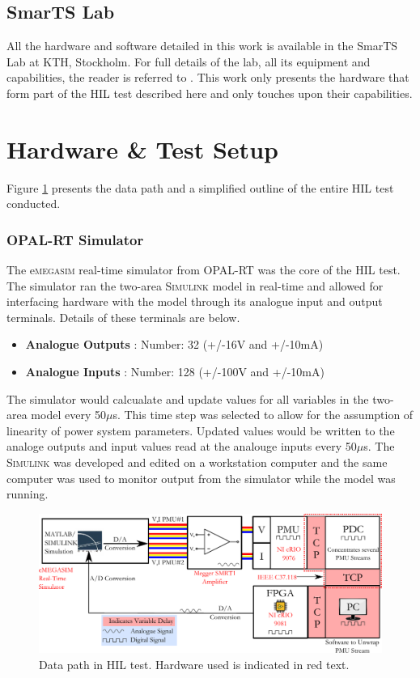 \documentclass[conference]{IEEEtran}
\begin{document}
\subsection{SmarTS Lab}
All the hardware and software detailed in this work is available in the SmarTS Lab at KTH, Stockholm. For full details of the lab, all its equipment and capabilities, the reader is referred to \cite{SmarTSLab}. This work only presents the hardware that form part of the HIL test described here and only touches upon their capabilities.

\section{Hardware \& Test Setup}

Figure \ref{ExperimentOutline} presents the data path and a simplified outline of the entire HIL test conducted.

\subsubsection{OPAL-RT Simulator}
The e\textsc{megasim} real-time simulator from OPAL-RT\cite{OPALemegasim} was the core of the HIL test. The simulator ran the two-area \textsc{Simulink} model in real-time and allowed for interfacing hardware with the model through its analogue input and output terminals.  Details of these terminals are below.

\begin{itemize}
\item \textbf{Analogue Outputs} : Number: 32 (+/-16V and +/-10mA)
\item \textbf{Analogue Inputs} : Number: 128 (+/-100V and +/-10mA)
\end{itemize}

The simulator would calcualate and update values for all variables in the two-area model every 50$\mu$s. This time step was selected to allow for the assumption of linearity of power system parameters. Updated values would be written to the analoge outputs and input values read at the analouge inputs every 50$\mu$s. The \textsc{Simulink} was developed and edited on a workstation computer and the same computer was used to monitor output from the simulator while the model was running.
\begin{figure}[t]
\centering
\includegraphics[width=5.5in]{DelaySources.pdf} 
\caption{Data path in HIL test. Hardware used is indicated in {\color{red}red} text.}
\label{ExperimentOutline}
\end{figure}
\end{document}
